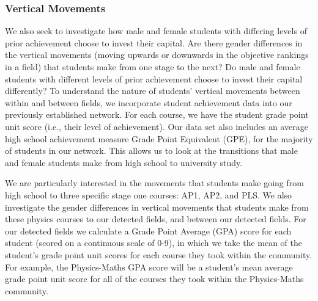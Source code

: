 \subsubsection*{Vertical Movements}
We also seek to investigate how male and female students with differing levels of prior achievement choose to invest their capital. Are there gender differences in the vertical movements (moving upwards or downwards in the objective rankings in a field) that students make from one stage to the next? Do male and female students with different levels of prior achievement choose to invest their capital differently? To understand the nature of students' vertical movements between within and between fields, we incorporate student achievement data into our previously established network. For each course, we have the student grade point unit score (i.e., their level of achievement). Our data set also includes an average high school achievement measure Grade Point Equivalent (GPE), for the majority of students in our network. This allows us to look at the transitions that male and female students make from high school to university study. 

We are particularly interested in the movements that students make going from high school to three specific stage one courses: AP1, AP2, and PLS. We also investigate the gender differences in vertical movements that students make from these physics courses to our detected fields, and between our detected fields. For our detected fields we calculate a Grade Point Average (GPA) score for each student (scored on a continuous scale of 0-9), in which we take the mean of the student's grade point unit scores for each course they took within the community. For example, the Physics-Maths GPA score will be a student's mean average grade point unit score for all of the courses they took within the Physics-Maths community.

